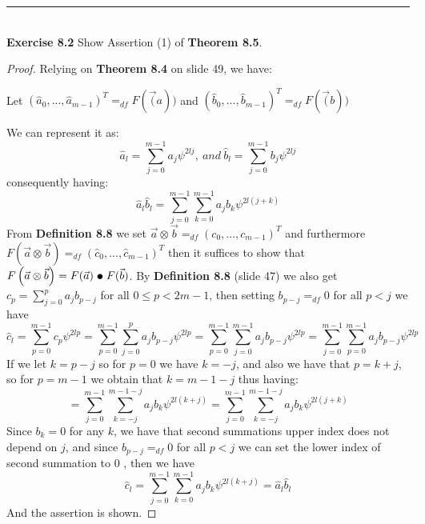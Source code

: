 \documentclass[a4paper]{article}
\begin{document}
\noindent\rule{12cm}{0.4pt}\\
\noindent \textbf{Exercise 8.2}  Show Assertion (1) of \textbf{Theorem 8.5}.
\begin{proof}
Relying on \textbf{Theorem 8.4} on slide 49, we have:
\begin{center}
Let $(\widehat{a}_0,...,\widehat{a}_{m-1})^{T} =_{df}F(\vec(a))$ and $(\widehat{b}_0,...,\widehat{b}_{m-1})^{T} =_{df}F(\vec(b))$
\end{center}
We can represent it as:
$$\widehat{a}_l = \sum_{j=0}^{m-1}a_j\psi^{2lj},\ and\ \widehat{b}_l = \sum_{j=0}^{m-1}b_j\psi^{2lj}$$
consequently having:
$$\widehat{a}_l\widehat{b}_l = \sum_{j=0}^{m-1}\sum_{k=0}^{m-1}a_jb_k\psi^{2l(j+k)}$$
From \textbf{Definition 8.8} we set $\vec{a} \otimes \vec{b} =_{df}(c_0,...,c_{m-1})^T$ and furthermore $F\left(\vec{a} \otimes \vec{b}\right) =_{df}(\widehat{c}_0,...,\widehat{c}_{m-1})^T$ then it suffices to show that $F\left(\vec{a} \otimes \vec{b}\right) = F(\vec{a})\ \tikz\draw[black,fill=black] (0,0) circle (.5ex);\ F(\vec{b})$. By \textbf{Definition 8.8} (slide 47) we also get $c_{p}=  \sum_{j=0}^{p}a_{j}b_{p-j}$ for all $ 0 \leq p < 2m-1$, then setting $b_{p-j} =_{df} 0$ for all $p < j$ we have
$$\widehat{c}_l = \sum_{p=0}^{m-1}c_p\psi^{2lp} =  \sum_{p=0}^{m-1}\sum_{j=0}^{p}a_{j}b_{p-j}\psi^{2lp} =  \sum_{p=0}^{m-1}\sum_{j=0}^{m-1}a_{j}b_{p-j}\psi^{2lp} =  \sum_{j=0}^{m-1}\sum_{p=0}^{m-1}a_{j}b_{p-j}\psi^{2lp}$$
If we let $k = p-j$ so for $p =0$ we have $ k = -j$, and also we have that $p=k+j$, so for $p = m - 1$ we obtain that $k = m - 1 - j$ thus having:
$$=  \sum_{j=0}^{m-1}\sum_{k= -j}^{m-1-j}a_{j}b_{k}\psi^{2l(k+j)} = \sum_{j=0}^{m-1}\sum_{k= -j}^{m-1-j}a_{j}b_{k}\psi^{2l(j+k)}$$
Since $b_{k}=0$ for any $k$, we have that second summations upper index does not depend on $j$, and since $b_{p-j} =_{df} 0$ for all $p < j$ we can set the lower index of second summation to 0 , then we have
$$\widehat{c}_l  =  \sum_{j=0}^{m-1}\sum_{k= 0}^{m-1}a_{j}b_{k}\psi^{2l(k+j)}=\widehat{a}_l\widehat{b}_l$$
And the assertion is shown.
\end{proof}
\end{document}
